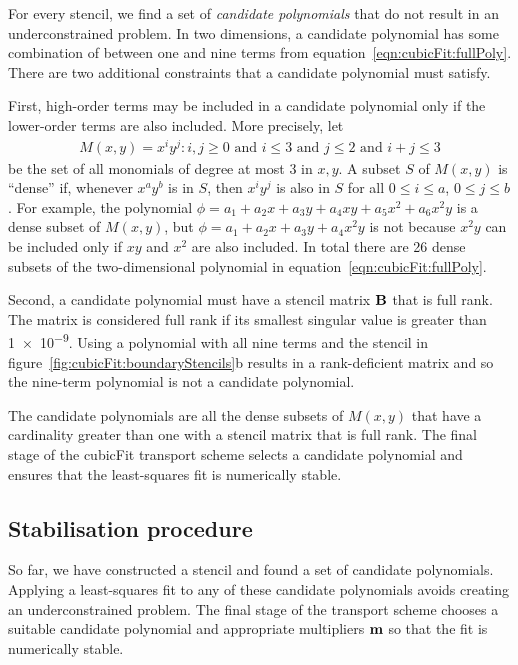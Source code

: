For every stencil, we find a set of \textit{candidate polynomials} that do not result in an underconstrained problem.
In two dimensions, a candidate polynomial has some combination of between one and nine terms from equation~\eqref{eqn:cubicFit:fullPoly}.  There are two additional constraints that a candidate polynomial must satisfy.

First, high-order terms may be included in a candidate polynomial only if the lower-order terms are also included.
More precisely, let
\begin{align}
	M(x, y) = { x^i y^j : i,j \geq 0 \text{ and } i \leq 3 \text{ and } j \leq 2 \text{ and } i+j \leq 3}
\end{align}
be the set of all monomials of degree at most \num{3} in $x, y$.
A subset $S$ of $M(x,y)$ is ``dense'' if, whenever $x^a y^b$ is in $S$, then $x^i y^j$ is also in $S$ for all $0 \leq i \leq a$, $0 \leq j \leq b$.
For example, the polynomial $\phi = a_1 + a_2 x + a_3 y + a_4 xy + a_5 x^2 + a_6 x^2 y$ is a dense subset of $M(x,y)$, but $\phi = a_1 + a_2 x + a_3 y + a_4 x^2 y$ is not because $x^2 y$ can be included only if $xy$ and $x^2$ are also included.
In total there are 26 dense subsets of the two-dimensional polynomial in equation~\eqref{eqn:cubicFit:fullPoly}.

Second, a candidate polynomial must have a stencil matrix $\mathbf{B}$ that is full rank.  The matrix is considered full rank if its smallest singular value is greater than \num{1e-9}.
Using a polynomial with all nine terms and the stencil in figure~\ref{fig:cubicFit:boundaryStencils}b results in a rank-deficient matrix and so the nine-term polynomial is not a candidate polynomial.

The candidate polynomials are all the dense subsets of $M(x,y)$ that have a cardinality greater than one with a stencil matrix that is full rank.  The final stage of the cubicFit transport scheme selects a candidate polynomial and ensures that the least-squares fit is numerically stable.

\subsection{Stabilisation procedure}
\label{sec:cubicFit:stabilisation}
So far, we have constructed a stencil and found a set of candidate polynomials.  Applying a least-squares fit to any of these candidate polynomials avoids creating an underconstrained problem.  The final stage of the transport scheme chooses a suitable candidate polynomial and appropriate multipliers $\mathbf{m}$ so that the fit is numerically stable.

